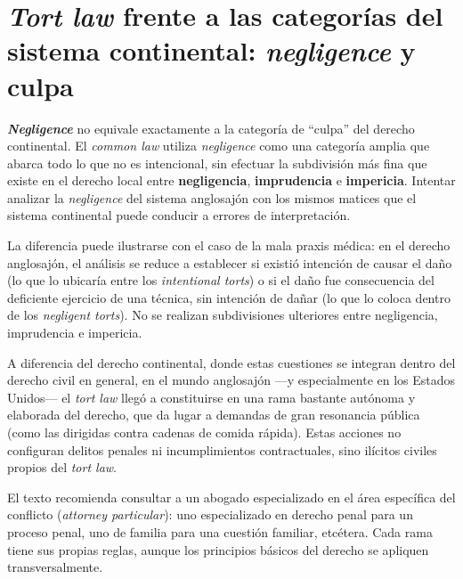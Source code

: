 \documentclass[12pt,oneside]{book}
\begin{document}
\section{\textit{Tort law} frente a las categorías del sistema continental: \textit{negligence} y culpa}

\begin{important}
\textbf{\textit{Negligence}} no equivale exactamente a la categoría de ``culpa'' del derecho continental. El \textit{common law} utiliza \textit{negligence} como una categoría amplia que abarca todo lo que no es intencional, sin efectuar la subdivisión más fina que existe en el derecho local entre \textbf{negligencia}, \textbf{imprudencia} e \textbf{impericia}. Intentar analizar la \textit{negligence} del sistema anglosajón con los mismos matices que el sistema continental puede conducir a errores de interpretación.
\end{important}

La diferencia puede ilustrarse con el caso de la mala praxis médica: en el derecho anglosajón, el análisis se reduce a establecer si existió intención de causar el daño (lo que lo ubicaría entre los \textit{intentional torts}) o si el daño fue consecuencia del deficiente ejercicio de una técnica, sin intención de dañar (lo que lo coloca dentro de los \textit{negligent torts}). No se realizan subdivisiones ulteriores entre negligencia, imprudencia e impericia.

\begin{note}
A diferencia del derecho continental, donde estas cuestiones se integran dentro del derecho civil en general, en el mundo anglosajón ---y especialmente en los Estados Unidos--- el \textit{tort law} llegó a constituirse en una rama bastante autónoma y elaborada del derecho, que da lugar a demandas de gran resonancia pública (como las dirigidas contra cadenas de comida rápida). Estas acciones no configuran delitos penales ni incumplimientos contractuales, sino ilícitos civiles propios del \textit{tort law}.
\end{note}

El texto recomienda consultar a un abogado especializado en el área específica del conflicto (\textit{attorney particular}): uno especializado en derecho penal para un proceso penal, uno de familia para una cuestión familiar, etcétera. Cada rama tiene sus propias reglas, aunque los principios básicos del derecho se apliquen transversalmente.

\end{document}
